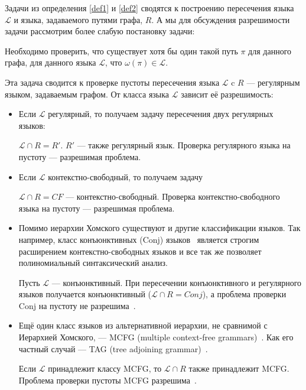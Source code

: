 Задачи из определения \ref{def1} и \ref{def2} сводятся к построению пересечения языка $\mathcal{L}$ и языка, задаваемого путями графа, $R$.
А мы для обсуждения разрешимости задачи рассмотрим более слабую постановку задачи:

\begin{definition}
    Необходимо проверить, что существует хотя бы один такой путь $\pi$ для данного графа, для данного языка $\mathcal{L}$, что $\omega(\pi) \in \mathcal{L}$.

\end{definition}

Эта задача сводится к проверке пустоты пересечения языка $\mathcal{L}$ c $R$ --- регулярным языком, задаваемым графом. От класса языка $\mathcal{L}$ зависит её разрешимость:

\begin{itemize}
    \item Если $\mathcal{L}$ регулярный, то получаем задачу пересечения двух регулярных языков:

    $\mathcal{L} \cap R = R'$.
    $R'$ --- также регулярный язык.
    Проверка регулярного языка на пустоту --- разрешимая проблема.

    \item Если $\mathcal{L}$ контекстно-свободный, то получаем задачу

    $\mathcal{L} \cap R = CF$ --- контекстно-свободный.
    Проверка контекстно-свободного языка на пустоту --- разрешимая проблема.

    \item Помимо иерархии Хомского существуют и другие классификации языков.
    Так например, класс конъюнктивных (Conj)
    языков~\cite{DBLP:journals/jalc/Okhotin01}
    является строгим расширением контекстно-свободных языков и все так же позволяет полиномиальный синтаксический анализ.

    Пусть $\mathcal{L}$ --- конъюнктивный. При пересечении конъюнктивного и регулярного языков получается конъюнктивный ($\mathcal{L} \cap R = Conj$), а проблема проверки Conj на пустоту не разрешима~\cite{DBLP:journals/tcs/Okhotin03a}.

    \item Ещё один класс языков из альтернативной иерархии, не сравнимой с Иерархией Хомского, --- MCFG (multiple context-free grammars)~\cite{SEKI1991191}.
    Как его частный случай --- TAG (tree adjoining grammar)~\cite{Joshi1997}.

    Если $\mathcal{L}$ принадлежит классу MCFG, то $\mathcal{L} \cap R$ также принадлежит MCFG. Проблема проверки пустоты MCFG разрешима~\cite{SEKI1991191}.

\end{itemize}

